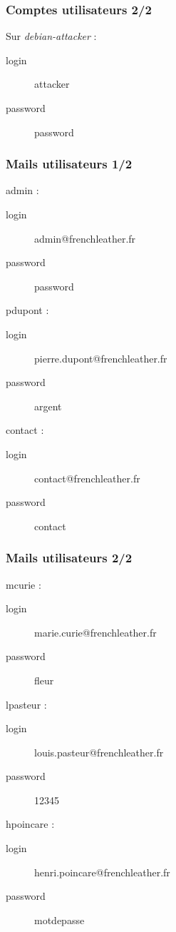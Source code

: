 \documentclass{beamer}
\begin{document}
		\begin{frame}
			\frametitle{Comptes utilisateurs 2/2}
			\begin{alertblock}{Sur \textit{debian-attacker} :}
				\begin{description}
					\item[login] attacker
					\item[password] password
				\end{description}
			\end{alertblock}
		\end{frame}
		\begin{frame}
			\frametitle{Mails utilisateurs 1/2}
			\begin{alertblock}{admin :}
				\begin{description}
					\item[login] admin@frenchleather.fr
					\item[password] password
				\end{description}
			\end{alertblock}
			\begin{alertblock}{pdupont :}
				\begin{description}
					\item[login] pierre.dupont@frenchleather.fr
					\item[password] argent
				\end{description}
			\end{alertblock}
			\begin{alertblock}{contact :}
				\begin{description}
					\item[login] contact@frenchleather.fr
					\item[password] contact
				\end{description}
			\end{alertblock}
		\end{frame}
		\begin{frame}
			\frametitle{Mails utilisateurs 2/2}
			\begin{alertblock}{mcurie :}
				\begin{description}
					\item[login] marie.curie@frenchleather.fr
					\item[password] fleur
				\end{description}
			\end{alertblock}
			\begin{alertblock}{lpasteur :}
				\begin{description}
					\item[login] louis.pasteur@frenchleather.fr
					\item[password] 12345
				\end{description}
			\end{alertblock}
			\begin{alertblock}{hpoincare :}
				\begin{description}
					\item[login] henri.poincare@frenchleather.fr
					\item[password] motdepasse
				\end{description}
			\end{alertblock}
		\end{frame}
\end{document}
